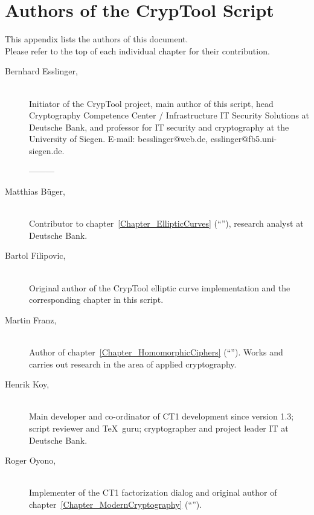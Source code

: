 \newpage
\hypertarget{appendix-authors}{}
\section{Authors of the CrypTool Script}
\label{s:appendix-authors}

This appendix lists the authors of this document.\\
Please refer to the top of each individual chapter for their contribution.

\begin{description}

\item[Bernhard Esslinger,] \mbox{}\\
Initiator of the CrypTool project, main author of this script, head Cryptography Competence Center / Infrastructure IT Security Solutions at Deutsche Bank, and professor for IT security and cryptography at the University of Siegen.
E-mail: besslinger@web.de, esslinger@fb5.uni-siegen.de.

---------

\item[Matthias B\"uger,] \mbox{}\\ 
Contributor to chapter~\ref{Chapter_EllipticCurves} (``''),
research analyst at Deutsche Bank.

\item[Bartol Filipovic,] \mbox{}\\
Original author of the CrypTool elliptic curve
implementation and the corresponding chapter in this script.

\item[Martin Franz,] \mbox{}\\
Author of chapter~\ref{Chapter_HomomorphicCiphers}
(``'').
Works and carries out research in the area of applied cryptography.

\item[Henrik Koy,] \mbox{}\\
Main developer and co-ordinator of CT1 development
since version 1.3; script reviewer and \TeX\ guru; cryptographer 
and project leader IT at Deutsche Bank.

\item[Roger Oyono,] \mbox{}\\
Implementer of the CT1 factorization dialog and original author
of chapter~\ref{Chapter_ModernCryptography} (``'').


\end{description}
